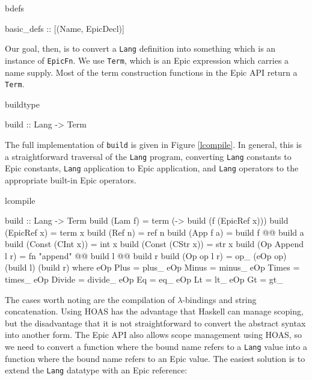 \begin{SaveVerbatim}{bdefs}

basic_defs :: [(Name, EpicDecl)]

\end{SaveVerbatim}

\noindent
Our goal, then, is to convert a \texttt{Lang} definition into
something which is an instance of \texttt{EpicFn}. We use
\texttt{Term}, which is an Epic expression which carries a name
supply. Most of the term construction functions in the Epic API return
a \texttt{Term}.

\begin{SaveVerbatim}{buildtype}

build :: Lang -> Term

\end{SaveVerbatim}

\noindent
The full implementation of \texttt{build} is given in Figure \ref{lcompile}.
In general, this is a straightforward traversal of the \texttt{Lang}
program, converting \texttt{Lang} constants to Epic constants,
\texttt{Lang} application to Epic application, and \texttt{Lang}
operators to the appropriate built-in Epic operators. 
                  
\begin{SaveVerbatim}{lcompile}

build :: Lang -> Term
build (Lam f)          = term (\x -> build (f (EpicRef x)))
build (EpicRef x)      = term x
build (Ref n)          = ref n
build (App f a)        = build f @@ build a
build (Const (CInt x)) = int x
build (Const (CStr x)) = str x
build (Op Append l r)  = fn "append" @@ build l @@ build r
build (Op op l r)      = op_ (eOp op) (build l) (build r)
    where eOp Plus   = plus_
          eOp Minus  = minus_
          eOp Times  = times_
          eOp Divide = divide_
          eOp Eq     = eq_
          eOp Lt     = lt_
          eOp Gt     = gt_

\end{SaveVerbatim}

The cases worth noting are the compilation of $\lambda$-bindings and
string concatenation. Using HOAS has the advantage that Haskell can
manage scoping, but the disadvantage that it is not straightforward to
convert the abstract syntax into another form. The Epic API also
allows scope management using HOAS, so we need to convert a function
where the bound name refers to a \texttt{Lang} value into a function
where the bound name refers to an Epic value. The easiest solution is
to extend the \texttt{Lang} datatype with an Epic reference:


